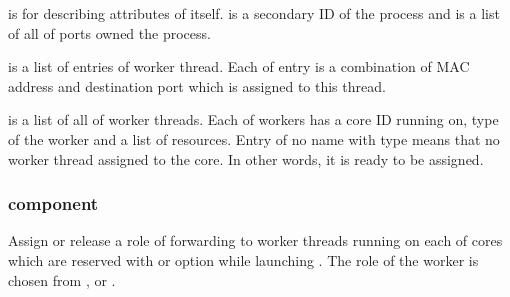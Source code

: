 \documentclass[a4paper,11pt,openany,oneside,english]{sphinxmanual}
\begin{document}
\begin{sphinxVerbatim}[commandchars=\\\{\},formatcom=\footnotesize]
\end{sphinxVerbatim}

 is for describing attributes of  itself.
 is a secondary ID of the process and  is a list of
all of ports owned the process.

 is a list of entries of  worker thread.
Each of entry is a combination of MAC address and destination port which is
assigned to this thread.

 is a list of all of worker threads. Each of workers has a
core ID running on, type of the worker and a list of resources.
Entry of no name with  type means that no worker thread assigned to
the core. In other words, it is ready to be assigned.


\subsubsection{component}
\label{\detokenize{commands/secondary/spp_vf:component}}\label{\detokenize{commands/secondary/spp_vf:commands-spp-vf-component}}
Assign or release a role of forwarding to worker threads running on each of
cores which are reserved with  or  option while launching
. The role of the worker is chosen from ,  or
.
\end{document}
